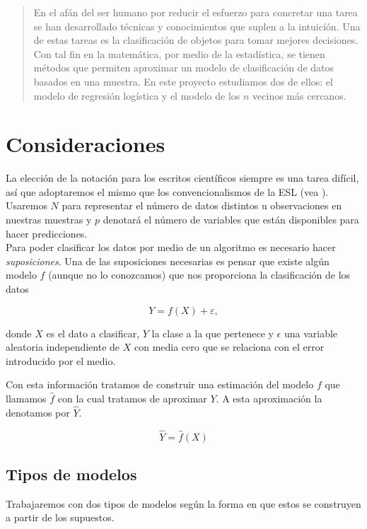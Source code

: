 \documentclass[11pt,letterpaper,reqno]{article}
\begin{document}
\pagebreak
\pagestyle{plain}

\begin{abstract}
En el afán del ser humano por reducir el esfuerzo para concretar una tarea se han desarrollado técnicas y conocimientos que suplen a la intuicíón. Una de estas tareas es la clasificación de objetos para tomar mejores decisiones. Con tal fin en la matemática, por medio de la estadística, se tienen métodos que permiten aproximar un modelo de clasificación de datos basados en una muestra. En este proyecto estudiamos dos de ellos: el modelo de regresión logística y el modelo de los $n$ vecinos más cercanos.
\end{abstract}

\section{Consideraciones}

La elección de la notación para los escritos científicos siempre es una tarea difícil, así que adoptaremos el mismo que los convencionalismos de la ESL (vea \cite{sLearning2013}). Usaremos $N$ para representar el número de datos distintos u observaciones en nuestras muestras y $p$ denotará el número de variables que están disponibles para hacer predicciones.\\

Para poder clasificar los datos por medio de un algoritmo es necesario hacer \textit{suposiciones}. Una de las suposiciones necesarias es pensar que existe algún modelo $f$ (aunque no lo conozcamos) que nos proporciona la clasificación de los datos

$$
Y = f(X) + \varepsilon,
$$

donde $X$ es el dato a clasificar, $Y$ la clase a la que pertenece y $\epsilon$  una variable aleatoria independiente de $X$ con media cero que se relaciona con el error introducido por el medio.

Con esta información tratamos de construir una estimación del modelo $f$ que llamamos $\hat{f}$ con la cual tratamos de aproximar $Y$. A esta aproximación la denotamos por $\hat{Y}$.

$$
\hat{Y} = \hat{f}(X)
$$

\subsection{Tipos de modelos}

Trabajaremos con dos tipos de modelos según la forma en que estos se construyen a partir de los supuestos.
\end{document}
